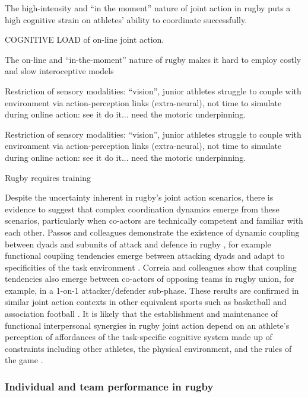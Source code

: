 \begin{CJK}{UTF8}{gbsn}
The high-intensity and ``in the moment'' nature of joint action in rugby puts a high cognitive strain on athletes' ability to coordinate successfully.

COGNITIVE LOAD of on-line joint action.

The on-line and ``in-the-moment'' nature of rugby makes it hard to employ costly and slow interoceptive models

Restriction of sensory modalities: ``vision'', junior athletes struggle to couple with environment via action-perception links (extra-neural), not time to simulate during online action: see it do it... need the motoric underpinning.

Restriction of sensory modalities: ``vision'', junior athletes struggle to couple with environment via action-perception links (extra-neural), not time to simulate during online action: see it do it... need the motoric underpinning.



Rugby requires training






Despite the uncertainty inherent in rugby's joint action scenarios, there is evidence to suggest that complex coordination dynamics emerge from these scenarios, particularly when co-actors are technically competent and familiar with each other. Passos and colleagues demonstrate the existence of dynamic coupling between dyads and subunits of attack and defence in rugby \citep{Passos2011,Correia2014}, for example functional coupling tendencies emerge between attacking dyads and adapt to specificities of the task environment \textcite{Passos2011}.  Correia and colleagues \textcite{Correia2014} show that coupling tendencies also emerge between co-actors of opposing teams in rugby union, for example, in a 1-on-1 attacker/defender sub-phase.  These results are confirmed in similar joint action contexts in other equivalent sports such as basketball and association football \citep{Duarte2013}. It is likely that the establishment and maintenance of functional interpersonal synergies in rugby joint action depend on an athlete's perception of affordances of the task-specific cognitive system made up of constraints including other athletes, the physical environment, and the rules of the game \citep{Passos2012}.






\subsubsection{Individual and team performance in rugby}



\end{CJK}
